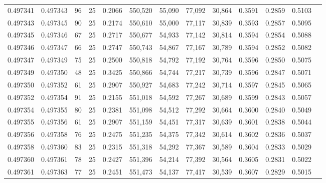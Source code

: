 \begin{tabular}{rrrrrrrrrrrrr}
0.497341 & 0.497343 &    96 &  25 &                                     0.2066 & 550,520 &  55,090 &  77,092 &  30,864 & 0.3591 & 0.2859 & 0.5103 \\
0.497343 & 0.497345 &    90 &  25 &                                     0.2174 & 550,610 &  55,000 &  77,117 &  30,839 & 0.3593 & 0.2857 & 0.5095 \\
0.497345 & 0.497346 &    67 &  25 &                                     0.2717 & 550,677 &  54,933 &  77,142 &  30,814 & 0.3594 & 0.2854 & 0.5088 \\
0.497346 & 0.497347 &    66 &  25 &                                     0.2747 & 550,743 &  54,867 &  77,167 &  30,789 & 0.3594 & 0.2852 & 0.5082 \\
0.497347 & 0.497349 &    75 &  25 &                                     0.2500 & 550,818 &  54,792 &  77,192 &  30,764 & 0.3596 & 0.2850 & 0.5075 \\
0.497349 & 0.497350 &    48 &  25 &                                     0.3425 & 550,866 &  54,744 &  77,217 &  30,739 & 0.3596 & 0.2847 & 0.5071 \\
0.497350 & 0.497352 &    61 &  25 &                                     0.2907 & 550,927 &  54,683 &  77,242 &  30,714 & 0.3597 & 0.2845 & 0.5065 \\
0.497352 & 0.497354 &    91 &  25 &                                     0.2155 & 551,018 &  54,592 &  77,267 &  30,689 & 0.3599 & 0.2843 & 0.5057 \\
0.497354 & 0.497355 &    80 &  25 &                                     0.2381 & 551,098 &  54,512 &  77,292 &  30,664 & 0.3600 & 0.2840 & 0.5049 \\
0.497355 & 0.497356 &    61 &  25 &                                     0.2907 & 551,159 &  54,451 &  77,317 &  30,639 & 0.3601 & 0.2838 & 0.5044 \\
0.497356 & 0.497358 &    76 &  25 &                                     0.2475 & 551,235 &  54,375 &  77,342 &  30,614 & 0.3602 & 0.2836 & 0.5037 \\
0.497358 & 0.497360 &    83 &  25 &                                     0.2315 & 551,318 &  54,292 &  77,367 &  30,589 & 0.3604 & 0.2833 & 0.5029 \\
0.497360 & 0.497361 &    78 &  25 &                                     0.2427 & 551,396 &  54,214 &  77,392 &  30,564 & 0.3605 & 0.2831 & 0.5022 \\
0.497361 & 0.497363 &    77 &  25 &                                     0.2451 & 551,473 &  54,137 &  77,417 &  30,539 & 0.3607 & 0.2829 & 0.5015 \\

\end{tabular}
